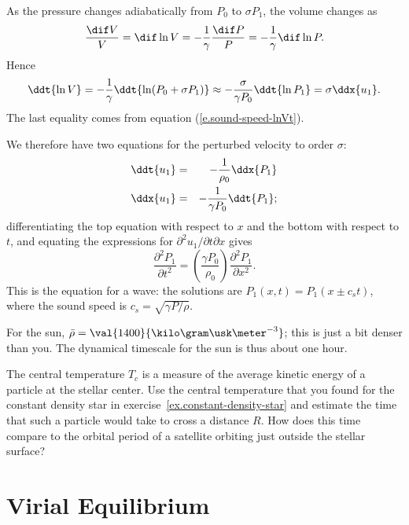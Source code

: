 \begin{sidebar}
As the pressure changes adiabatically from $P_{0}$ to $\sigma P_{1}$, the volume changes as
\[
	\frac{\dif V}{V} = \dif\ln V = -\frac{1}{\gamma}\frac{\dif P}{P} = -\frac{1}{\gamma}\dif\ln P.
\]
Hence
\begin{equation}\label{e.sound-speed-lnVt-2}
	\ddt{\ln V} = -\frac{1}{\gamma}\ddt{\ln (P_{0} + \sigma P_{1})} \approx 
		-\frac{\sigma}{\gamma P_{0}}\ddt{\ln P_{1}} = \sigma \ddx{u_{1}}.
\end{equation}
The last equality comes from equation (\ref{e.sound-speed-lnVt}).

We therefore have two equations for the perturbed velocity to order $\sigma$:
\begin{eqnarray*}
\ddt{u_{1}} &=& -\frac{1}{\rho_{0}} \ddx{P_{1}}\\
\ddx{u_{1}} &=& -\frac{1}{\gamma P_{0}} \ddt{P_{1}};
\end{eqnarray*}
differentiating the top equation with respect to $x$ and the bottom with respect to $t$, and equating the expressions for $\partial^{2}u_{1}/\partial t\partial x$ gives
\begin{equation}\label{e.sound-speed}
\frac{\partial^{2} P_{1}}{\partial t^{2}} = \left(\frac{\gamma P_{0}}{\rho_{0}}\right)
	\frac{\partial^{2} P_{1}}{\partial x^{2}}.
\end{equation}
This is the equation for a wave: the solutions are $P_{1}(x,t) = P_{1}(x\pm c_{s}t)$, where the sound speed is $c_{s} = \sqrt{\gamma P/\rho}$.
\end{sidebar}

For the sun, $\bar{\rho} = \val{1400}{\kilo\gram\usk\meter^{-3}}$; this is just a bit denser than you. The dynamical timescale for the sun is thus about one hour.

\begin{exercisebox}
The central temperature $T_{c}$ is a measure of the average kinetic energy of a particle at the stellar center. Use the central temperature that you found for the constant density star in exercise~\ref{ex.constant-density-star} and estimate the time that such a particle would take to cross a distance $R$. How does this time compare to the orbital period of a satellite orbiting just outside the stellar surface?
\end{exercisebox}

\section{Virial Equilibrium}
\label{s.virial-equilibrium}

